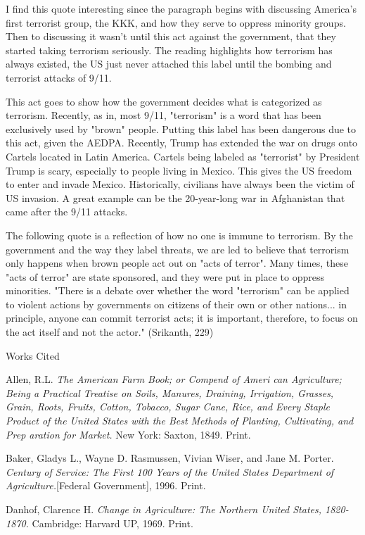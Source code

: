 \documentclass[12pt]{article}
\newcommand{\bibent}{\noindent \hangindent 40pt}
\newenvironment{workscited}{\newpage \begin{center} Works Cited \end{center}}{\newpage }
\begin{document}
\begin{flushleft}
I find this quote interesting since the paragraph begins with discussing
America's first terrorist group, the KKK, and how they serve to oppress minority groups.
Then to discussing it wasn't until this act against the government,
that they started taking terrorism seriously.
The reading highlights how terrorism has always existed,
the US just never attached this label until the bombing and terrorist attacks of 9/11.

This act goes to show how the government decides what is categorized as terrorism.
Recently, as in, most 9/11, "terrorism" is a word that has been exclusively used by "brown" people.
Putting this label has been dangerous due to this act, given the AEDPA.
Recently, Trump has extended the war on drugs onto Cartels located in Latin America.
Cartels being labeled as "terrorist" by President Trump is scary, especially to people
living in Mexico. This gives the US freedom to enter and invade Mexico.
Historically, civilians have always been the victim of US invasion.
A great example can be the 20-year-long war in Afghanistan that came
after the 9/11 attacks.


The following quote is a reflection of how no one is immune to terrorism.
By the government and the way they label threats, we are led to believe
that terrorism only happens when brown people act out on "acts of terror".
Many times, these "acts of terror" are state sponsored, and they were put in place
to oppress minorities.
"There is a debate over whether the word "terrorism" can be applied
to violent actions by governments on citizens of their own or other nations...
in principle, anyone can commit terrorist acts; it is important, therefore, to focus
on the act itself and not the actor." (Srikanth, 229)


\newpage


\begin{workscited}

\bibent
Allen, R.L. \textit{The American Farm Book; or Compend of Ameri can Agriculture; Being a Practical Treatise on Soils, Manures, Draining, Irrigation, Grasses, Grain, Roots, Fruits, Cotton, Tobacco, Sugar Cane, Rice, and Every Staple Product of the United States with the Best Methods of Planting, Cultivating, and Prep aration for Market.} New York: Saxton, 1849. Print.

\bibent
Baker, Gladys L., Wayne D. Rasmussen, Vivian Wiser, and Jane M. Porter. \textit{Century of Service: The First 100 Years of the United States Department of Agriculture.}[Federal Government], 1996. Print.

\bibent
Danhof, Clarence H. \textit{Change in Agriculture: The Northern United States, 1820-1870.} Cambridge: Harvard UP, 1969. Print.


\end{workscited}

\end{flushleft}
\end{document}
